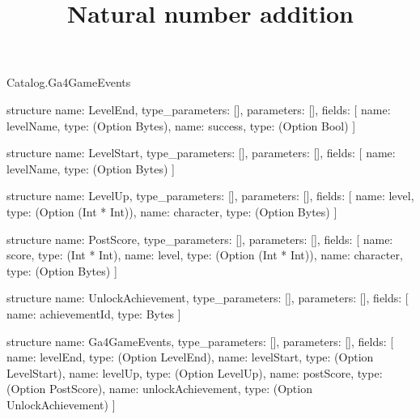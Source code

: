 \begin{lexlean}{Catalog.Ga4GameEvents}
\title{Natural number addition}
\begin{semanticmodule}
structure{
  name: LevelEnd,
  type_parameters: [],
  parameters: [],
  fields: [
    {name: levelName, type: (Option Bytes)},
    {name: success, type: (Option Bool)}
  ]
}

structure{
  name: LevelStart,
  type_parameters: [],
  parameters: [],
  fields: [
    {name: levelName, type: (Option Bytes)}
  ]
}

structure{
  name: LevelUp,
  type_parameters: [],
  parameters: [],
  fields: [
    {name: level, type: (Option (Int * Int))},
    {name: character, type: (Option Bytes)}
  ]
}

structure{
  name: PostScore,
  type_parameters: [],
  parameters: [],
  fields: [
    {name: score, type: (Int * Int)},
    {name: level, type: (Option (Int * Int))},
    {name: character, type: (Option Bytes)}
  ]
}

structure{
  name: UnlockAchievement,
  type_parameters: [],
  parameters: [],
  fields: [
    {name: achievementId, type: Bytes}
  ]
}

structure{
  name: Ga4GameEvents,
  type_parameters: [],
  parameters: [],
  fields: [
    {name: levelEnd, type: (Option LevelEnd)},
    {name: levelStart, type: (Option LevelStart)},
    {name: levelUp, type: (Option LevelUp)},
    {name: postScore, type: (Option PostScore)},
    {name: unlockAchievement, type: (Option UnlockAchievement)}
  ]
}
\end{semanticmodule}
\end{lexlean}
